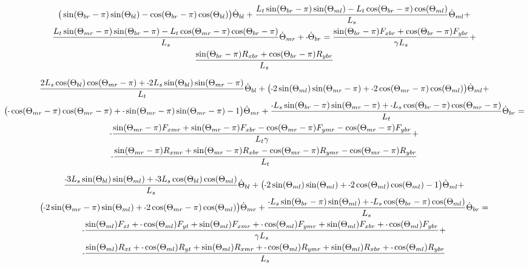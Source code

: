 \documentclass[11pt, landscape]{article}
\newcommand{\mn}{\scalebox{0.7}[1.0]{-}}
\begin{document}
\begin{multline}
\big(\sin(\Theta_{br}-\pi)\sin(\Theta_{bl}) - \cos(\Theta_{br}-\pi)\cos(\Theta_{bl})\big)\dot{\Theta}_{bl} + 
\frac{L_{t}\sin(\Theta_{br}-\pi)\sin(\Theta_{ml}) - L_{t}\cos(\Theta_{br}-\pi)\cos(\Theta_{ml})}{L_{s}}\dot{\Theta}_{ml}  + \\
\frac{L_{t}\sin(\Theta_{mr}-\pi)\sin(\Theta_{br}-\pi) - L_{t}\cos(\Theta_{mr}-\pi)\cos(\Theta_{br}-\pi)}{L_{s}}\dot{\Theta}_{mr} +
\mn\dot{\Theta}_{br} =
\frac{\sin(\Theta_{br}-\pi)F_{xbr} + \cos(\Theta_{br}-\pi)F_{ybr}}{\gamma L_{s}} + \\
\frac{\sin(\Theta_{br}-\pi)R_{xbr} + \cos(\Theta_{br}-\pi)R_{ybr}}{L_{s}}
\end{multline}


\begin{multline}
\frac{2L_{s}\cos(\Theta_{bl})\cos(\Theta_{mr}-\pi) + \mn 2L_{s}\sin(\Theta_{bl})\sin(\Theta_{mr}-\pi)}{L_{t}}\dot{\Theta}_{bl} + 
\big(\mn 2\sin(\Theta_{ml})\sin(\Theta_{mr}-\pi) + \mn 2\cos(\Theta_{mr}-\pi)\cos(\Theta_{ml}) \big)\dot{\Theta}_{ml} + \\
\big( \mn \cos(\Theta_{mr}-\pi)\cos(\Theta_{mr}-\pi) + \mn\sin(\Theta_{mr}-\pi)\sin(\Theta_{mr}-\pi) - 1\big)\dot{\Theta}_{mr} + 
\frac{\mn L_{s}\sin(\Theta_{br}-\pi)\sin(\Theta_{mr}-\pi) + \mn L_{s}\cos(\Theta_{br}-\pi)\cos(\Theta_{mr}-\pi)}{L_{t}}\dot{\Theta}_{br} = \\
\mn\frac{\sin(\Theta_{mr}-\pi)F_{xmr} + \sin(\Theta_{mr}-\pi)F_{xbr} - \cos(\Theta_{mr}-\pi)F_{ymr} - \cos(\Theta_{mr}-\pi)F_{ybr}}{L_{t}\gamma} + \\
\mn\frac{\sin(\Theta_{mr}-\pi)R_{xmr} + \sin(\Theta_{mr}-\pi)R_{xbr} - \cos(\Theta_{mr}-\pi)R_{ymr} - \cos(\Theta_{mr}-\pi)R_{ybr}}{L_{t}}
\end{multline}



\begin{multline}
\frac{\mn 3L_{s}\sin(\Theta_{bl})\sin(\Theta_{ml}) + \mn3L_{s}\cos(\Theta_{bl})\cos(\Theta_{ml})}{L_s}\dot{\Theta}_{bl} + 
\big(\mn 2\sin(\Theta_{ml})\sin(\Theta_{ml}) + \mn 2\cos(\Theta_{ml})\cos(\Theta_{ml}) - 1\big)\dot{\Theta}_{ml} + \\
\big(\mn 2\sin(\Theta_{mr}-\pi)\sin(\Theta_{ml}) + \mn 2\cos(\Theta_{mr}-\pi)\cos(\Theta_{ml}) \big)\dot{\Theta}_{mr} + 
\frac{\mn L_{s}\sin(\Theta_{br}-\pi)\sin(\Theta_{ml}) + \mn L_{s}\cos(\Theta_{br}-\pi)\cos(\Theta_{ml})}{L_s}\dot{\Theta}_{br} = \\
\mn \frac{\sin(\Theta_{ml})F_{xt } + \mn \cos(\Theta_{ml})F_{yt } + \sin(\Theta_{ml})F_{xmr} + \mn \cos(\Theta_{ml})F_{ymr} + \sin(\Theta_{ml})F_{xbr} + \mn \cos(\Theta_{ml})F_{ybr}}{\gamma L_s} + \\
\mn \frac{\sin(\Theta_{ml})R_{xt } + \mn \cos(\Theta_{ml})R_{yt } + \sin(\Theta_{ml})R_{xmr} + \mn \cos(\Theta_{ml})R_{ymr} + \sin(\Theta_{ml})R_{xbr} + \mn \cos(\Theta_{ml})R_{ybr}}{L_s}
\end{multline}
\end{document}
